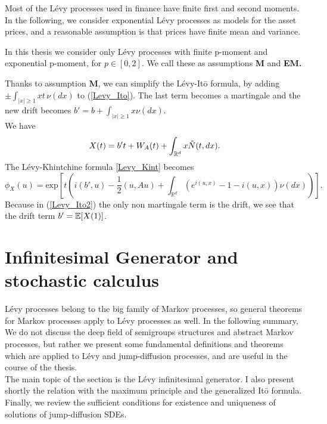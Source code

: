 Most of the Lévy processes used in finance have finite first and second moments. In the following, we consider exponential
Lévy processes as models for the asset prices, and a reasonable assumption is that prices have finite mean and variance. 

\begin{center}
\begin{riquadro}{12cm}
In this thesis we consider only Lévy processes with finite p-moment and exponential p-moment, for $p\in [0,2]$.
We call these as assumptions \textbf{M} and \textbf{EM.} 
\end{riquadro}
\end{center}

\vspace{1.5em}

Thanks to assumption \textbf{M}, we can simplify the Lévy-It\={o} formula, by adding $\pm \int_{|x| \geq 1} x t\, \nu(dx)$ 
to (\ref{Levy_Ito}). The last term becomes a martingale and the new drift becomes $b' = b+\int_{|x| \geq 1} x \nu(dx)$.\\
We have 
\begin{equation}\label{Levy_Ito2}
 X(t) = b't + W_A(t) + \int_{\mathbb{R}^d} x \tilde{N}(t,dx).
\end{equation}
The Lévy-Khintchine formula \ref{Levy_Kint} becomes
\begin{equation}\label{Levy_Kint2}
\phi_X(u) = \mbox{exp} \left[ t \left( i(b',u) - \frac{1}{2}(u,Au) + \int_{\mathbb{R}^d} 
	   ( e^{i(u,x)} -1 -i(u,x) ) \nu(dx) \right) \right]. 
\end{equation}
Because in (\ref{Levy_Ito2}) the only non martingale term is the drift, we see that the drift term $b' = \mathbb{E}[X(1)]$.


\section{Infinitesimal Generator and stochastic calculus}

Lévy processes belong to the big family of Markov processes, so general theorems for Markov processes apply to
Lévy processes as well.
In the following summary,
We do not discuss the deep field of semigroups structures and abstract Markov processes, but rather we present some fundamental definitions and 
theorems which are applied to Lévy and jump-diffusion processes, and are useful in the course of the thesis.\\
The main topic of the section is the Lévy infinitesimal generator. I also present shortly the relation with the maximum principle  
and the generalized It\={o} formula.
Finally, we review the sufficient conditions for existence and uniqueness of solutions of jump-diffusion SDEs. 


